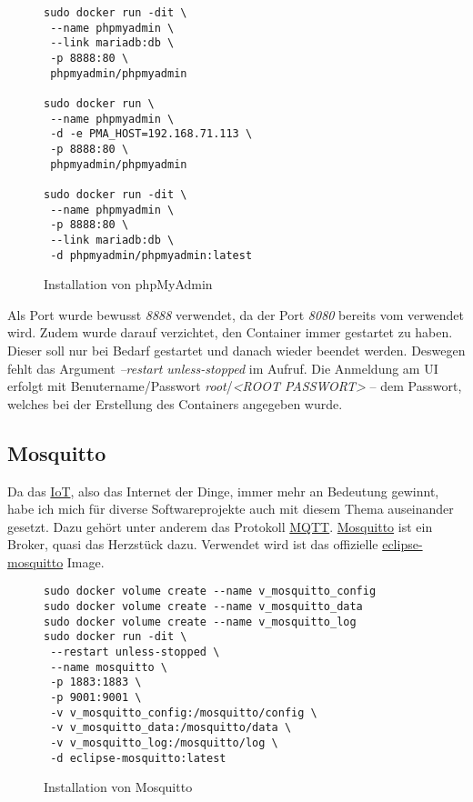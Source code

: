 \documentclass[12pt,a4paper,ngerman]{article}
\newcommand{\code}[1]{\textit{#1}}
\newcommand{\jpacaption}[1]{\caption{#1}\label{fig:#1}}
\begin{document}
\begin{figure}[H]
    \begin{lstlisting}
sudo docker run -dit \
 --name phpmyadmin \
 --link mariadb:db \
 -p 8888:80 \
 phpmyadmin/phpmyadmin

sudo docker run \
 --name phpmyadmin \
 -d -e PMA_HOST=192.168.71.113 \
 -p 8888:80 \
 phpmyadmin/phpmyadmin

sudo docker run -dit \
 --name phpmyadmin \
 -p 8888:80 \
 --link mariadb:db \
 -d phpmyadmin/phpmyadmin:latest
\end{lstlisting}
    \jpacaption{Installation von phpMyAdmin}
\end{figure}

Als Port wurde bewusst \code{8888} verwendet, da der Port \code{8080} bereits
vom  verwendet wird. Zudem wurde darauf verzichtet,
den Container immer gestartet zu haben. Dieser soll nur bei Bedarf gestartet und
danach wieder beendet werden. Deswegen fehlt das Argument \code{--restart
    unless-stopped} im Aufruf. Die Anmeldung am UI erfolgt mit Benutername/Passwort
\code{root}/\code{<ROOT PASSWORT>} -- dem Passwort, welches bei der Erstellung
des  Containers angegeben wurde.

\subsection{Mosquitto}
Da das
\href{https://de.wikipedia.org/wiki/Internet_der_Dinge#targetText=Das%20Internet%20der%20Dinge%20(IdD,und%20Kommunikationstechniken%20zusammenarbeiten%20zu%20lassen.}{IoT},
also das Internet der Dinge, immer mehr an Bedeutung gewinnt, habe ich mich für
diverse Softwareprojekte auch mit diesem Thema auseinander gesetzt. Dazu gehört
unter anderem das Protokoll \href{https://mqtt.org/}{MQTT}.
\href{https://mosquitto.org/}{Mosquitto} ist ein Broker, quasi das Herzstück
dazu. Verwendet wird ist das offizielle
\href{https://hub.docker.com/_/eclipse-mosquitto}{eclipse-mosquitto} Image.

\begin{figure}[H]
    \begin{lstlisting}
sudo docker volume create --name v_mosquitto_config
sudo docker volume create --name v_mosquitto_data
sudo docker volume create --name v_mosquitto_log
sudo docker run -dit \
 --restart unless-stopped \
 --name mosquitto \
 -p 1883:1883 \
 -p 9001:9001 \
 -v v_mosquitto_config:/mosquitto/config \
 -v v_mosquitto_data:/mosquitto/data \
 -v v_mosquitto_log:/mosquitto/log \
 -d eclipse-mosquitto:latest
\end{lstlisting}
    \jpacaption{Installation von Mosquitto}
\end{figure}
\end{document}
